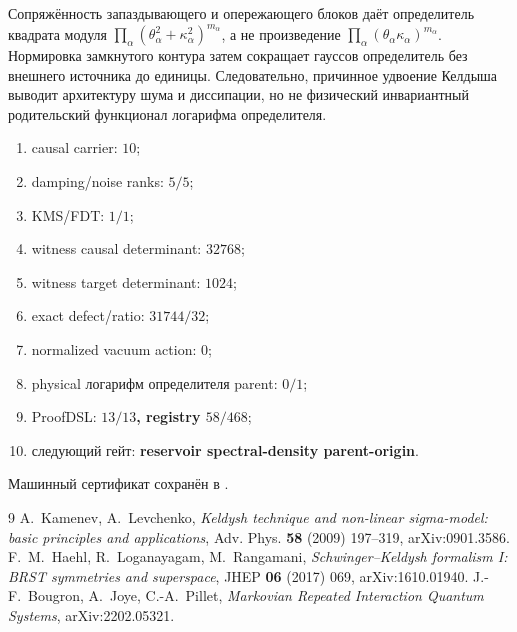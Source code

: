 \begin{nogocriterion}
Сопряжённость запаздывающего и опережающего блоков даёт определитель квадрата
модуля $\prod_\alpha(\theta_\alpha^2+\kappa_\alpha^2)^{m_\alpha}$, а не
произведение $\prod_\alpha(\theta_\alpha\kappa_\alpha)^{m_\alpha}$.
Нормировка замкнутого контура затем сокращает гауссов определитель без
внешнего источника до единицы. Следовательно, причинное удвоение Келдыша
выводит архитектуру шума и диссипации, но не физический инвариантный
родительский функционал логарифма определителя.
\end{nogocriterion}

\begin{protocol}\begin{enumerate}
\item causal carrier: \textbf{$10$};
\item damping/noise ranks: \textbf{$5/5$};
\item KMS/FDT: \textbf{$1/1$};
\item witness causal determinant: \textbf{$32768$};
\item witness target determinant: \textbf{$1024$};
\item exact defect/ratio: \textbf{$31744/32$};
\item normalized vacuum action: \textbf{$0$};
\item physical логарифм определителя parent: \textbf{$0/1$};
\item ProofDSL: \textbf{$13/13$, registry $58/468$};
\item следующий гейт: \textbf{reservoir spectral-density parent-origin}.
\end{enumerate}\end{protocol}

Машинный сертификат сохранён в
.

\begin{thebibliography}{9}
A.~Kamenev, A.~Levchenko,
\emph{Keldysh technique and non-linear sigma-model: basic principles and
applications}, Adv. Phys. \textbf{58} (2009) 197--319,
arXiv:0901.3586.
F.~M.~Haehl, R.~Loganayagam, M.~Rangamani,
\emph{Schwinger--Keldysh formalism I: BRST symmetries and superspace},
JHEP \textbf{06} (2017) 069, arXiv:1610.01940.
J.-F.~Bougron, A.~Joye, C.-A.~Pillet,
\emph{Markovian Repeated Interaction Quantum Systems},
arXiv:2202.05321.
\end{thebibliography}